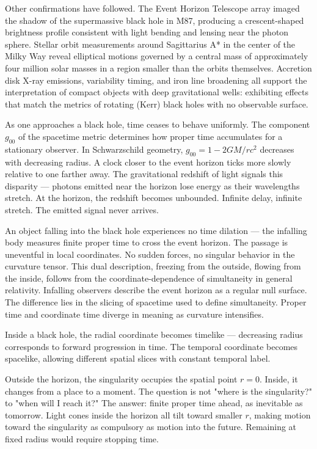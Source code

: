 Other confirmations have followed. The Event Horizon Telescope array imaged the shadow of the supermassive black hole in M87, producing a crescent-shaped brightness profile consistent with light bending and lensing near the photon sphere. Stellar orbit measurements around Sagittarius A* in the center of the Milky Way reveal elliptical motions governed by a central mass of approximately four million solar masses in a region smaller than the orbits themselves. Accretion disk X-ray emissions, variability timing, and iron line broadening all support the interpretation of compact objects with deep gravitational wells: exhibiting effects that match the metrics of rotating (Kerr) black holes with no observable surface.

As one approaches a black hole, time ceases to behave uniformly. The component $g_{00}$ of the spacetime metric determines how proper time accumulates for a stationary observer. In Schwarzschild geometry, $g_{00} = 1 - 2GM/rc^2$ decreases with decreasing radius. A clock closer to the event horizon ticks more slowly relative to one farther away. The gravitational redshift of light signals this disparity — photons emitted near the horizon lose energy as their wavelengths stretch. At the horizon, the redshift becomes unbounded. Infinite delay, infinite stretch. The emitted signal never arrives.

An object falling into the black hole experiences no time dilation — the infalling body measures finite proper time to cross the event horizon. The passage is uneventful in local coordinates. No sudden forces, no singular behavior in the curvature tensor. This dual description, freezing from the outside, flowing from the inside, follows from the coordinate-dependence of simultaneity in general relativity. Infalling observers describe the event horizon as a regular null surface. The difference lies in the slicing of spacetime used to define simultaneity. Proper time and coordinate time diverge in meaning as curvature intensifies.

Inside a black hole, the radial coordinate becomes timelike — decreasing radius corresponds to forward progression in time. The temporal coordinate becomes spacelike, allowing different spatial slices with constant temporal label.

Outside the horizon, the singularity occupies the spatial point $r = 0$. Inside, it changes from a place to a moment. The question is not "where is the singularity?" to "when will I reach it?" The answer: finite proper time ahead, as inevitable as tomorrow. Light cones inside the horizon all tilt toward smaller $r$, making motion toward the singularity as compulsory as motion into the future. Remaining at fixed radius would require stopping time.

